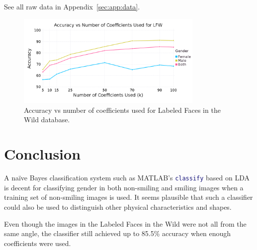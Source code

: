 \documentclass[hidelinks,11pt]{article}
\begin{document}
See all raw data in Appendix~\ref{sec:app:data}.

\begin{figure}[!ht]
  \centering
  \includegraphics[width=0.8\textwidth]{accuracy_k_lfw.png}
  \caption{Accuracy vs number of coefficients used for Labeled Faces in the
  Wild database.}
  \label{fig:analysis:lda:accuracy_lfw}
\end{figure}

\section{Conclusion}
\label{sec:conclusion}

A na\"ive Bayes classification system such as MATLAB's
\lstinline[language=Matlab]!classify! based on LDA is decent for classifying
gender in both non-smiling and smiling images when a training set of non-smiling
images is used. It seems plausible that such a classifier could also be used to
distinguish other physical characteristics and shapes. 

Even though the images in the Labeled Faces in the Wild were not all from the
same angle, the classifier still achieved up to 85.5\% accuracy when enough
coefficients were used. 


\end{document}
